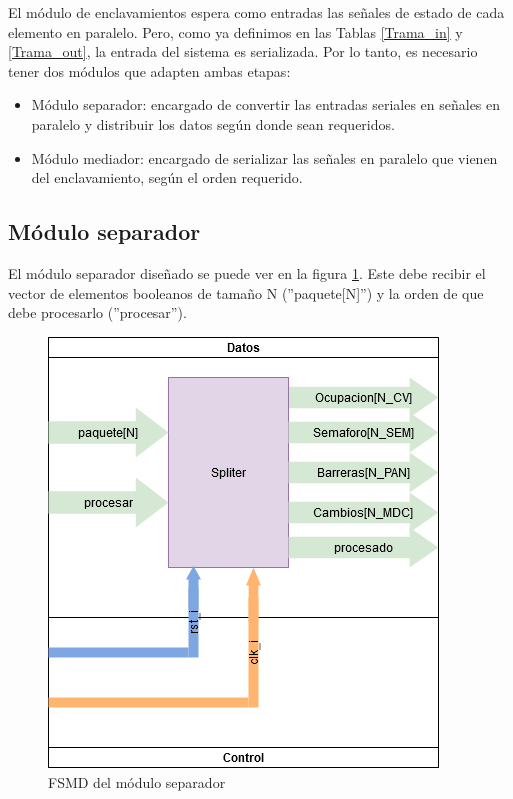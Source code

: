 	El módulo de enclavamientos espera como entradas las señales de estado de cada elemento en paralelo. Pero, como ya definimos en las Tablas \ref{Trama_in} y \ref{Trama_out}, la entrada del sistema es serializada. Por lo tanto, es necesario tener dos módulos que adapten ambas etapas: 
	
	\begin{itemize}
		\item Módulo separador: encargado de convertir las entradas seriales en señales en paralelo y distribuir los datos según donde sean requeridos.
		\item Módulo mediador: encargado de serializar las señales en paralelo que vienen del enclavamiento, según el orden requerido.
	\end{itemize}
	 
	\subsection{Módulo separador}
	
		El módulo separador diseñado se puede ver en la figura \ref{fig:FSMD_Separador}. Este debe recibir el vector de elementos booleanos de tamaño N (''paquete[N]'') y la orden de que debe procesarlo (''procesar''). 
		
		\begin{figure}[h]
		\centering
			\includegraphics[scale=.5]{./Figures/FSMD-Separador}
			\caption{FSMD del módulo separador}
			\label{fig:FSMD_Separador}
		\end{figure}
		
